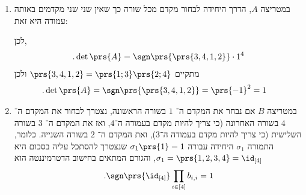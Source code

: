 \documentclass[a4paper,10pt,twoside,openany]{book}
\newcommand*\mymatrixbox[5][]{\node [fit= (m-#2-#3) (m-#4-#5)] [draw=blue,thick,dashed,rounded corners,inner sep=-2pt,#1] {};}
\newcommand{\highlightcells}[2][]{%
  \foreach \r/\c in {#2} {%
    \mymatrixbox[#1]{\r}{\c}{\r}{\c}%
  }%
}
\begin{document}
\begin{solution}
\begin{enumerate}
\item במטריצה
$A$,
הדרך היחידה לבחור מקדם מכל שורה כך שאין שני שני מקדמים באותה עמודה היא זאת:

\begin{center}
\end{center}

לכן,
\begin{align*}
\text{.} \det\prs{A} = \sgn\prs{\prs{3,4,1,2}} \cdot 1^4
\end{align*}
מתקיים
$\prs{3,4,1,2} = \prs{1;3} \prs{2;4}$
ולכן
\begin{align*}
\text{.} \det\prs{A} &= \sgn\prs{\prs{3,4,1,2}} = \prs{-1}^2 = 1
\end{align*}

\item במטריצה
$B$
אם נבחר את המקדם ה־%
$1$
בשורה הראשונה, נצטרך לבחור את המקדם ה־%
$4$
בשורה האחרונה (כי צריך להיות מקדם בעמודה ה־$4$, ואז את המקדם ה־%
$3$
בשורה השלישית (כי צריך להיות מקדם בעמודה ה־$3$), ואת המקדם ה־%
$2$
בשורה השנייה. כלומר, התמורה
$\sigma_1$
היחידה עבורה
$\sigma_1\prs{1} = 1$
שנצטרך להסתכל עליה בסכום היא
$\sigma_1 = \prs{1, 2, 3, 4} = \id_{[4]}$,
והגורם המתאים בחישוב הדטרמיננטה הוא
\[\text{.} \sgn\prs{\id_{[4]}} \prod_{i \in [4]} b_{i,i} = 1\]

\begin{center}
\end{center}
\end{enumerate}
\end{solution}
\end{document}
